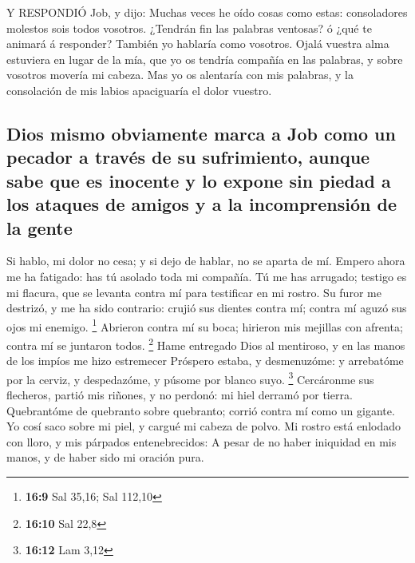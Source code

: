  Y RESPONDIÓ Job, y dijo:  Muchas veces he oído
cosas como estas: consoladores molestos sois todos vosotros.
 ¿Tendrán fin las palabras ventosas? ó ¿qué te animará á
responder?  También yo hablaría como vosotros. Ojalá vuestra
alma estuviera en lugar de la mía, que yo os tendría compañía en las
palabras, y sobre vosotros movería mi cabeza.  Mas yo os
alentaría con mis palabras, y la consolación de mis labios apaciguaría
el dolor vuestro.

\hypertarget{dios-mismo-obviamente-marca-a-job-como-un-pecador-a-travuxe9s-de-su-sufrimiento-aunque-sabe-que-es-inocente-y-lo-expone-sin-piedad-a-los-ataques-de-amigos-y-a-la-incomprensiuxf3n-de-la-gente}{%
\subsection{Dios mismo obviamente marca a Job como un pecador a través
de su sufrimiento, aunque sabe que es inocente y lo expone sin piedad a
los ataques de amigos y a la incomprensión de la
gente}\label{dios-mismo-obviamente-marca-a-job-como-un-pecador-a-travuxe9s-de-su-sufrimiento-aunque-sabe-que-es-inocente-y-lo-expone-sin-piedad-a-los-ataques-de-amigos-y-a-la-incomprensiuxf3n-de-la-gente}}

 Si hablo, mi dolor no cesa; y si dejo de hablar, no se
aparta de mí.  Empero ahora me ha fatigado: has tú asolado
toda mi compañía.  Tú me has arrugado; testigo es mi
flacura, que se levanta contra mí para testificar en mi rostro.
 Su furor me destrizó, y me ha sido contrario: crujió sus
dientes contra mí; contra mí aguzó sus ojos mi enemigo. \footnote{\textbf{16:9}
  Sal 35,16; Sal 112,10}  Abrieron contra mí su boca;
hirieron mis mejillas con afrenta; contra mí se juntaron todos.
\footnote{\textbf{16:10} Sal 22,8}  Hame entregado Dios al
mentiroso, y en las manos de los impíos me hizo estremecer 
Próspero estaba, y desmenuzóme: y arrebatóme por la cerviz, y
despedazóme, y púsome por blanco suyo. \footnote{\textbf{16:12} Lam 3,12}
 Cercáronme sus flecheros, partió mis riñones, y no
perdonó: mi hiel derramó por tierra.  Quebrantóme de
quebranto sobre quebranto; corrió contra mí como un gigante.
 Yo cosí saco sobre mi piel, y cargué mi cabeza de polvo.
 Mi rostro está enlodado con lloro, y mis párpados
entenebrecidos:  A pesar de no haber iniquidad en mis
manos, y de haber sido mi oración pura.

